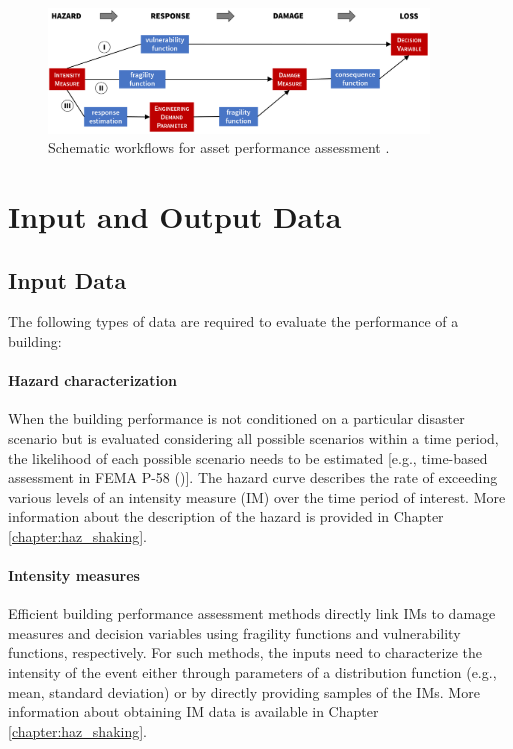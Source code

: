 \begin{figure}[htb]
    \centering
    \includegraphics[width=0.9\textwidth, angle = 0]{Figures/PBEapproaches.pdf}
    \caption{Schematic workflows for asset performance assessment \citep{deierlein2020cloud}.}
    \label{fig:perf_PBEapproaches}
\end{figure}
 
\section{Input and Output Data}
\label{sec:perf_bldg_io}

\subsection{Input Data}

The following types of data are required to evaluate the performance of a building:

\paragraph{Hazard characterization} When the building performance is not conditioned on a particular disaster scenario but is evaluated considering all possible scenarios within a time period, the likelihood of each possible scenario needs to be estimated [e.g., time-based assessment in FEMA P-58 (\cite{atc2018p-58-1})]. The hazard curve describes the rate of exceeding various levels of an intensity measure (IM) over the time period of interest. More information about the description of the hazard is provided in Chapter \ref{chapter:haz_shaking}.

\paragraph{Intensity measures} Efficient building performance assessment methods directly link IMs to damage measures and decision variables using fragility functions and vulnerability functions, respectively. For such methods, the inputs need to characterize the intensity of the event either through parameters of a distribution function (e.g., mean, standard deviation) or by directly providing samples of the IMs. More information about obtaining IM data is available in Chapter \ref{chapter:haz_shaking}.

